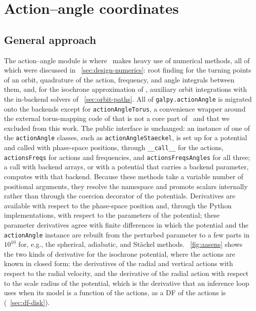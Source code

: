 \section{Action--angle coordinates}\label{sec:aa}

\subsection{General approach}\label{sec:aa-general}

The action--angle module is where \galpy\ makes heavy use of numerical
methods, all of which were discussed in
\sectionname~\ref{sec:design-numerics}: root finding for the turning
points of an orbit, quadrature of the action, frequency, and angle
integrals between them, and, for the isochrone approximation of
\citet{Bovy2014}, auxiliary orbit integrations with the in-backend
solvers of \sectionname~\ref{sec:orbit-paths}. All of
\texttt{galpy.actionAngle} is migrated onto the backends except for
\texttt{actionAngleTorus}, a convenience wrapper around the external
torus-mapping code of \citet{BinneyMcMillan2016} that is not a core
part of \galpy\ and that we excluded from this work. The public
interface is unchanged: an instance of one of the \texttt{actionAngle}
classes, such as \texttt{actionAngleStaeckel}, is set up for a
potential and called with phase-space positions, through
\texttt{\_\_call\_\_} for the actions, \texttt{actionsFreqs} for actions
and frequencies, and \texttt{actionsFreqsAngles} for all three; a call
with backend arrays, or with a potential that carries a backend
parameter, computes with that backend. Because these methods take a
variable number of positional arguments, they resolve the namespace and
promote scalars internally rather than through the coercion decorator
of the potentials. Derivatives are available with respect to the
phase-space position and, through the Python implementations, with
respect to the parameters of the potential; these parameter derivatives
agree with finite differences in which the potential and the
\texttt{actionAngle} instance are rebuilt from the perturbed parameter
to a few parts in $10^{10}$ for, e.g., the spherical, adiabatic, and
St\"{a}ckel methods. \figurename~\ref{fig:aasens} shows the two kinds of
derivative for the isochrone potential, where the actions are known in
closed form: the derivatives of the radial and vertical actions with
respect to the radial velocity, and the derivative of the radial action
with respect to the scale radius of the potential, which is the
derivative that an inference loop uses when its model is a function of
the actions, as a DF of the actions is
(\sectionname~\ref{sec:df-disk}).

